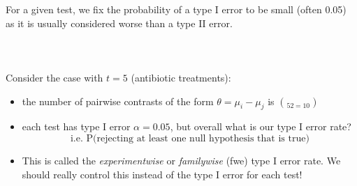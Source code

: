 For a given test, we fix the probability of a type I error to be small (often 0.05) as it is usually considered worse than a type II error.\\~\\
\color{red}{This is similar to the US justice system where we assume innocence until proven guilty.  For most crimes it is much worse to send an innocent person to jail than to let a guilty person go free}\\~\\
\color{black}
Consider the case with $t=5$ (antibiotic treatments): 
\begin{itemize}
\item the number of pairwise contrasts of the form $\theta=\mu_i-\mu_j$ is $\choose{5}{2}=10$
\item each test has type I error $\alpha=0.05$, but overall what is our type I error rate?
$$\mbox{i.e. P(rejecting at least one null hypothesis that is true)}$$
\item This is called the \textit{experimentwise} or \textit{familywise} (fwe) type I error rate.  We should really control this instead of the type I error for each test!\\~\\
\end{itemize}

